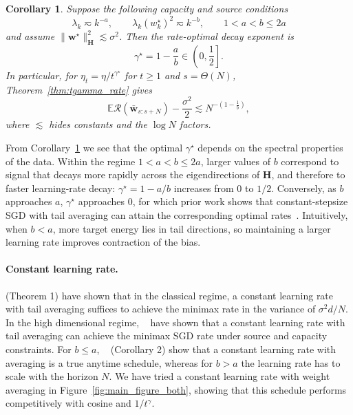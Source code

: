 \documentclass{article}
\newtheorem{corollary}{Corollary}
\def\bw{\bar{\mathbf{w}}}
\def\w{{\mathbf{w}}}
\def\H{{\mathbf{H}}}
\def\H{{\mathbf{H}}}
\def\risk{\mathcal{R}}
\newcommand{\E}{\mathbb{E}}
\def\bw{\bar{\mathbf{w}}}
\def\w{{\mathbf{w}}}
\def\H{{\mathbf{H}}}
\def\H{{\mathbf{H}}}
\def\risk{\mathcal{R}}
\theoremstyle{plain}
\def\bw{\bar{\mathbf{w}}}
\def\w{{\mathbf{w}}}
\def\H{{\mathbf{H}}}
\def\risk{\mathcal{R}}
\def\E{\mathbb{E}}
\begin{document}
\begin{corollary}
\label{cor:optimal_hps}
Suppose the following capacity and source conditions
\[
    \lambda_k \eqsim k^{-a},
    \qquad
    \lambda_k (w_k^\star)^2 \eqsim k^{-b},
    \qquad
    1 < a<b\leq 2a
\]
and assume $\|\w^\star\|_\H^2 \lesssim \sigma^2$. Then the rate-optimal decay exponent is
\[
    \gamma^\star = 1-\frac{a}{b}\in\left(0,\frac12\right].
\]
In particular, for $\eta_t=\eta/t^{\gamma^\star}$ for $t \geq 1$ and
$s=\Theta(N)$, Theorem~\ref{thm:tgamma_rate} gives
\[
    \E\risk(\bw_{s:s+N})-\frac{\sigma^2}{2}
    \lesssim
    N^{-\left(1-\frac1b\right)},
\]
where $\lesssim$ hides constants and the $\log N$ factors.
\end{corollary}
From Corollary~\ref{cor:optimal_hps} we see that the optimal $\gamma^\star$ depends on the spectral properties of the data. Within the regime $1<a<b\leq 2a$, larger values of $b$ correspond to signal that decays more rapidly across the eigendirections of $\H$, and therefore to faster learning-rate decay: $\gamma^\star=1-a/b$ increases from $0$ to $1/2$. Conversely, as $b$ approaches $a$, $\gamma^\star$ approaches $0$, for which prior work shows that constant-stepsize SGD with tail averaging can attain the corresponding optimal rates~\citep{zhang2024does,zou2023benign}. Intuitively, when $b < a$, more target energy lies in tail directions, so maintaining a larger learning rate improves contraction of the bias. 
\paragraph{Constant learning rate.}\citet{jain2018parallelizing} (Theorem 1) have shown that in the classical regime, a constant learning rate with tail averaging suffices to achieve the minimax rate in the variance of $\sigma^2 d/N$. In the high dimensional regime, ~\citet{zou2023benign,zhang2024does} have shown that a constant learning rate with tail averaging can achieve the minimax SGD rate under source and capacity constraints. For $b \leq a$, ~\citet{zhang2024does} (Corollary 2) show that a constant learning rate with averaging is a true anytime schedule, whereas for $b > a$ the learning rate has to scale with the horizon $N$. We have tried a constant learning rate with weight averaging in Figure~\ref{fig:main_figure_both}, showing that this schedule performs competitively with cosine and $1/t^\gamma$.
\end{document}
